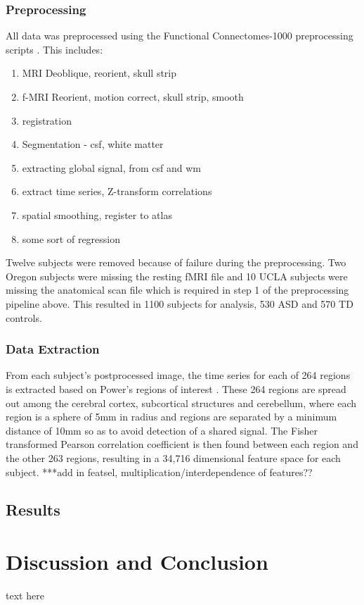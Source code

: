 \documentclass{llncs}
\begin{document}
\subsubsection{Preprocessing}
All data was preprocessed using the Functional Connectomes-1000 preprocessing scripts \cite{fcon}. This includes:
\begin{enumerate}
\item MRI Deoblique, reorient, skull strip
\item f-MRI Reorient, motion correct, skull strip, smooth
\item registration 
\item Segmentation - csf, white matter
\item extracting global signal, from csf and wm
\item extract time series, Z-transform correlations
\item spatial smoothing, register to atlas
\item some sort of regression
\end{enumerate}
Twelve subjects were removed because of failure during the preprocessing.  Two Oregon subjects were missing the resting fMRI file and 10 UCLA subjects were missing the anatomical scan file which is required in step 1 of the preprocessing pipeline above. This resulted in 1100 subjects for analysis, 530 ASD and 570 TD controls. 
\subsubsection{Data Extraction}
From each subject's postprocessed image, the time series for each of 264 regions is extracted based on Power's regions of interest \cite{Powers}. These 264 regions are spread out among the cerebral cortex, subcortical structures and cerebellum, where each region is a sphere of 5mm in radius and regions are separated by a minimum distance of 10mm so as to avoid detection of a shared signal. The Fisher transformed Pearson correlation coefficient is then found between each region and the other 263 regions, resulting in a 34,716 dimensional feature space for each subject. 
***add in featsel, multiplication/interdependence of features??
\subsection{Results}

\section{Discussion and Conclusion}
text here


{}


%
%
%
%
%
%
%
%
%
%
%
%


\end{document}
